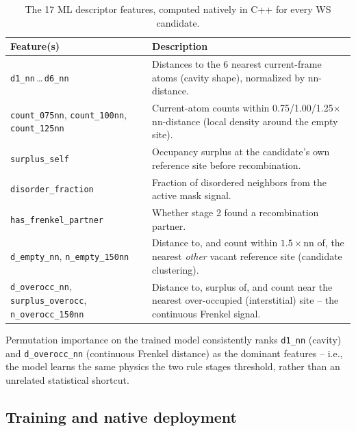 \documentclass[11pt]{article}
\newcommand{\code}[1]{\texttt{#1}}
\begin{document}
\begin{table}[h]
\centering
\caption{The 17 ML descriptor features, computed natively in C++ for every WS candidate.}
\label{tab:features}
\begin{tabular}{@{}lp{9.5cm}@{}}
\toprule
Feature(s) & Description \\
\midrule
\code{d1\_nn}\,\ldots\,\code{d6\_nn} & Distances to the 6 nearest current-frame atoms (cavity shape), normalized by nn-distance. \\
\code{count\_075nn}, \code{count\_100nn}, \code{count\_125nn} & Current-atom counts within 0.75/1.00/1.25$\times$ nn-distance (local density around the empty site). \\
\code{surplus\_self} & Occupancy surplus at the candidate's own reference site before recombination. \\
\code{disorder\_fraction} & Fraction of disordered neighbors from the active mask signal. \\
\code{has\_frenkel\_partner} & Whether stage 2 found a recombination partner. \\
\code{d\_empty\_nn}, \code{n\_empty\_150nn} & Distance to, and count within $1.5\times$nn of, the nearest \emph{other} vacant reference site (candidate clustering). \\
\code{d\_overocc\_nn}, \code{surplus\_overocc}, \code{n\_overocc\_150nn} & Distance to, surplus of, and count near the nearest over-occupied (interstitial) site -- the continuous Frenkel signal. \\
\bottomrule
\end{tabular}
\end{table}

Permutation importance on the trained model consistently ranks \code{d1\_nn} (cavity) and
\code{d\_overocc\_nn} (continuous Frenkel distance) as the dominant features -- i.e., the model
learns the same physics the two rule stages threshold, rather than an unrelated statistical
shortcut.

\subsection{Training and native deployment}
\end{document}
